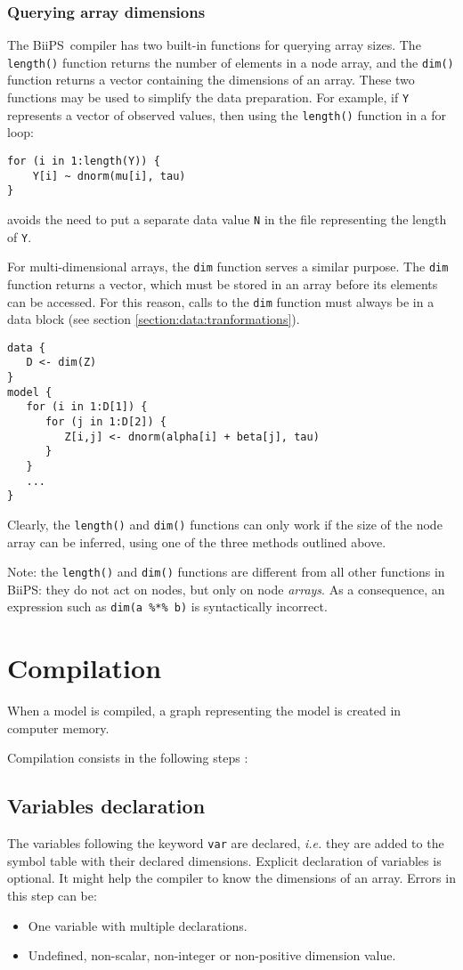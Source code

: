 \documentclass[11pt, a4paper, titlepage]{report}
\newcommand{\biips}{\textsf{BiiPS}}
\begin{document}
\subsubsection*{Querying array dimensions}  

The \biips\ compiler has two built-in functions for querying array
sizes.  The \verb+length()+ function returns the number of elements in
a node array, and the \verb+dim()+ function returns a vector
containing the dimensions of an array.  These two functions may be
used to simplify the data preparation. For example, if \verb+Y+
represents a vector of observed values, then using the \verb+length()+
function in a for loop:
\begin{verbatim}
for (i in 1:length(Y)) {
    Y[i] ~ dnorm(mu[i], tau)
}
\end{verbatim}
avoids the need to put a separate data value \verb+N+ in the file
representing the length of \verb+Y+.  

For multi-dimensional arrays, the \verb+dim+ function serves a similar
purpose. The \verb+dim+ function returns a vector, which must be stored
in an array before its elements can be accessed. For this reason, calls
to the \verb+dim+ function must always be in a data block (see section
\ref{section:data:tranformations}).
\begin{verbatim}
data {
   D <- dim(Z)
}
model {
   for (i in 1:D[1]) {
      for (j in 1:D[2]) {
         Z[i,j] <- dnorm(alpha[i] + beta[j], tau)
      }
   }
   ...
}
\end{verbatim}
Clearly, the \verb+length()+ and \verb+dim()+ functions can only
work if the size of the node array can be inferred, using one of the
three methods outlined above.

Note: the \verb+length()+ and \verb+dim()+ functions are different
from all other functions in \biips: they do not act on nodes, but only
on node {\em arrays}. As a consequence, an expression such as
\verb+dim(a %*% b)+ is syntactically incorrect.

\section{Compilation}

When a model is compiled, a graph representing the model is created in
computer memory.

Compilation consists in the following steps :
\subsection{Variables declaration}
The variables following the keyword \verb!var! are declared, \textit{i.e.} they are added to the  symbol table with their declared dimensions. Explicit declaration of variables is optional. It might help the compiler to know the dimensions of an array. Errors in this step can be:
\begin{itemize}
\item One variable with multiple declarations.
\item Undefined, non-scalar, non-integer or non-positive dimension value.
\end{itemize}
\end{document}
